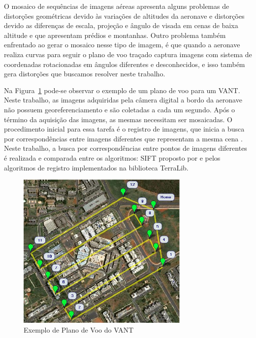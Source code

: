 \documentclass[9pt, a4paper, nofonttune, journal]{IEEEtran}
\begin{document}
O mosaico de sequências de imagens aéreas apresenta alguns problemas de distorções geométricas devido às variações de altitudes da aeronave e 
distorções devido as diferenças de escala, projeção e ângulo de visada em cenas de baixa altitude e que apresentam prédios e montanhas. 
Outro problema também enfrentado ao gerar o mosaico nesse tipo de imagem, 
é que quando a aeronave realiza curvas para seguir o plano de voo traçado captura imagens com sistema de coordenadas rotacionadas em ângulos diferentes e desconhecidos, 
e isso também gera distorções que buscamos resolver neste trabalho.

Na Figura~\ref{fig:plano_voo} pode-se observar o exemplo de um plano de voo para um VANT. 
Neste trabalho, as imagens adquiridas pela câmera digital a bordo da aeronave não possuem georeferenciamento e são coletadas a cada um segundo. 
Após o término da aquisição das imagens, as mesmas necessitam ser mosaicadas. 
O procedimento inicial para essa tarefa é o registro de imagens, que inicia a busca por correspondências entre imagens diferentes que representam a mesma cena \cite{Goltz:08}. 
Neste trabalho, a busca por correspondências entre pontos de imagens diferentes é realizada e comparada entre os algoritmos: SIFT proposto por \cite{Lowe} 
e pelos algoritmos de registro implementados na biblioteca TerraLib.

\begin{figure}[h!t]
  \centering
  \includegraphics[width=3.3in]{figuras/plano_voo}
  \caption{Exemplo de Plano de Voo do VANT}
  \label{fig:plano_voo}
\end{figure}
\end{document}
